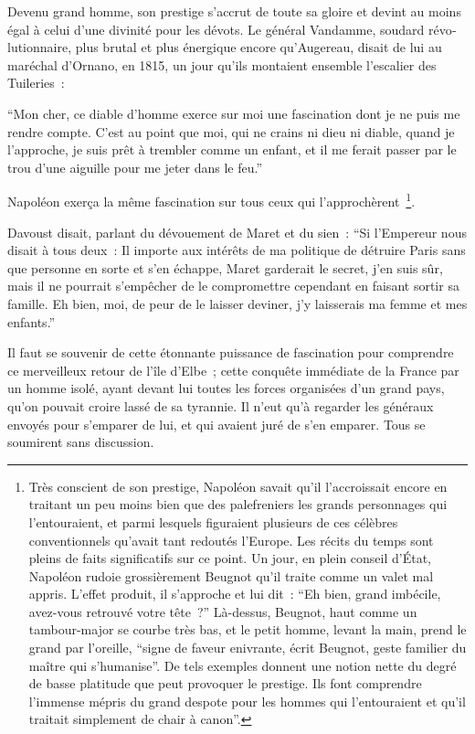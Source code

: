 \documentclass[french,twoside]{book} %
\begin{document}
Devenu grand homme, son prestige s’accrut de toute sa gloire et devint au moins égal à celui d’une divinité pour les dévots. Le général Vandamme, soudard révo­lutionnaire, plus brutal et plus énergique encore qu’Augereau, disait de lui au maré­chal d’Ornano, en 1815, un jour qu’ils montaient ensemble l’escalier des Tuileries :\par
“Mon cher, ce diable d’homme exerce sur moi une fascination dont je ne puis me rendre compte. C’est au point que moi, qui ne crains ni dieu ni diable, quand je l’approche, je suis prêt à trembler comme un enfant, et il me ferait passer par le trou d’une aiguille pour me jeter dans le feu.”\par
Napoléon exerça la même fascination sur tous ceux qui l’approchèrent \footnote{Très conscient de son prestige, Napoléon savait qu’il l’accroissait encore en traitant un peu moins bien que des palefreniers les grands personnages qui l’entouraient, et parmi lesquels figuraient plu­sieurs de ces célèbres conventionnels qu’avait tant redoutés l’Europe. Les récits du temps sont pleins de faits significatifs sur ce point. Un jour, en plein conseil d’État, Napoléon rudoie grossiè­rement Beugnot qu’il traite comme un valet mal appris. L’effet produit, il s’approche et lui dit : “Eh bien, grand imbécile, avez-vous retrouvé votre tête ?” Là-dessus, Beugnot, haut comme un tambour-major se courbe très bas, et le petit homme, levant la main, prend le grand par l’oreille, “signe de faveur enivrante, écrit Beugnot, geste familier du maître qui s’humanise”. De tels exemples donnent une notion nette du degré de basse platitude que peut provoquer le prestige. Ils font comprendre l’immense mépris du grand despote pour les hommes qui l’entouraient et qu’il traitait simplement de chair à canon”.}.\par
Davoust disait, parlant du dévouement de Maret et du sien : “Si l’Empereur nous disait à tous deux : Il importe aux intérêts de ma politique de détruire Paris sans que personne en sorte et s’en échappe, Maret garderait le secret, j’en suis sûr, mais il ne pourrait s’empêcher de le compromettre cependant en faisant sortir sa famille. Eh bien, moi, de peur de le laisser deviner, j’y laisserais ma femme et mes enfants.”\par
Il faut se souvenir de cette étonnante puissance de fascination pour comprendre ce merveilleux retour de l’île d’Elbe ; cette conquête immédiate de la France par un homme isolé, ayant devant lui toutes les forces organisées d’un grand pays, qu’on pouvait croire lassé de sa tyrannie. Il n’eut qu’à regarder les généraux envoyés pour s’emparer de lui, et qui avaient juré de s’en emparer. Tous se soumirent sans discussion.\par
\end{document}
